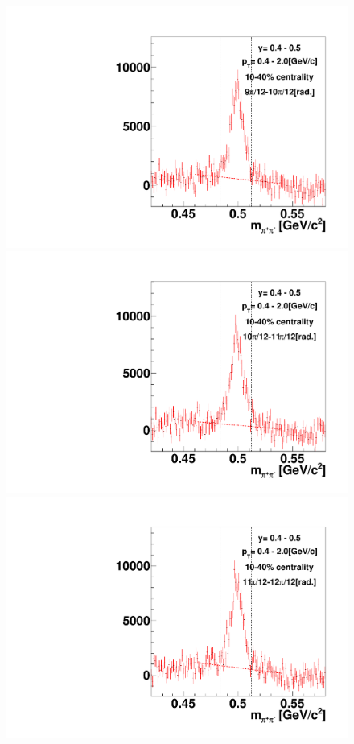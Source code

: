 \begin{figure}[h]
\includegraphics[width=0.14\linewidth]{chapterX/fig/ks_v1_sig/kf_ptslice0_cent1_ks_flow_phi10_rap0.pdf}
\includegraphics[width=0.14\linewidth]{chapterX/fig/ks_v1_sig/kf_ptslice0_cent1_ks_flow_phi11_rap0.pdf}
\includegraphics[width=0.14\linewidth]{chapterX/fig/ks_v1_sig/kf_ptslice0_cent1_ks_flow_phi12_rap0.pdf}


\end{figure}
